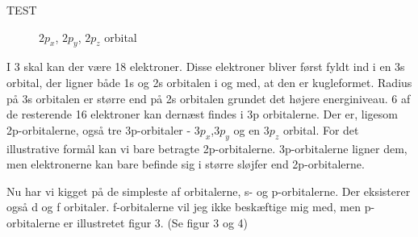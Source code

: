 \documentclass[12pt,a4paper]{article}
\theoremstyle{break}
\theoremstyle{nonumberplain}
\begin{document}
TEST
 
\begin{figure}[ht!]
  \centering
  \caption{$2p_x$, $2p_y$, $2p_z$ orbital} \end{figure}

I 3 skal kan der være 18 elektroner. Disse elektroner bliver først fyldt ind i en 3s orbital, der ligner både 1s og 2s orbitalen i og med, at den er kugleformet. Radius på 3s orbitalen er større end på 2s orbitalen grundet det højere energiniveau. 6 af de resterende 16 elektroner kan dernæst findes i 3p orbitalerne. Der er, ligesom 2p-orbitalerne, også tre 3p-orbitaler - $3p_x$,$3p_y$ og en $3p_z$ orbital. For det illustrative formål kan vi bare betragte 2p-orbitalerne. 3p-orbitalerne ligner dem, men elektronerne kan bare befinde sig i større sløjfer end 2p-orbitalerne. 

Nu har vi kigget på de simpleste af orbitalerne, s- og p-orbitalerne. Der eksisterer også d og f orbitaler. f-orbitalerne vil jeg ikke beskæftige mig med, men p-orbitalerne er illustretet  figur 3. (Se figur 3 og 4) 
\\
\end{document}

